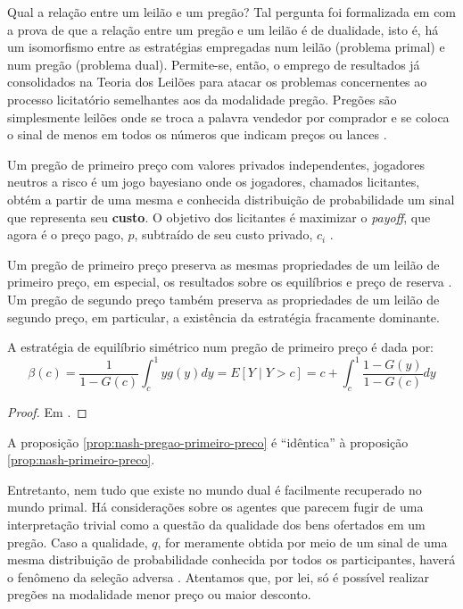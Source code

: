 Qual a relação entre um leilão e um pregão? Tal pergunta foi formalizada em \citet{deCastro2010} com a prova de que a relação entre um pregão e um leilão é de dualidade, isto é, há um isomorfismo entre as estratégias empregadas num leilão (problema primal) e num pregão (problema dual). Permite-se, então, o emprego de resultados já consolidados na Teoria dos Leilões para atacar os problemas concernentes ao processo licitatório semelhantes aos da modalidade pregão. Pregões são simplesmente leilões onde se troca a palavra vendedor por comprador e se coloca o sinal de menos em todos os números que indicam preços ou lances \citet{Shoham2008}.

Um pregão de primeiro preço com valores privados independentes, jogadores neutros a risco é um jogo bayesiano onde os jogadores, chamados licitantes, obtém a partir de uma mesma e conhecida distribuição de probabilidade um sinal que representa seu \textbf{custo}. O objetivo dos licitantes é maximizar o \emph{payoff}, que agora é o preço pago, $p$, subtraído de seu custo privado, $c_i$ \citet{Bugarin2022}.

Um pregão de primeiro preço preserva as mesmas propriedades de um leilão de primeiro preço, em especial, os resultados sobre os equilíbrios e preço de reserva \citet{Bugarin2022}. Um pregão de segundo preço também preserva as propriedades de um leilão de segundo preço, em particular, a existência da estratégia fracamente dominante.

\begin{proposicao}
	\label{prop:nash-pregao-primeiro-preco}
	A estratégia de equilíbrio simétrico num pregão de primeiro preço é dada por:
	\begin{equation}
		\beta(c) = \frac{1}{1-G(c)} \int_c^1 yg(y)dy = E[Y \mid Y > c] = c + \int_c^1 \frac{1-G(y)}{1-G(c)}dy
	\end{equation}
\end{proposicao}
\begin{proof}
	Em \citet{Bugarin2022}.
\end{proof}

A proposição \ref{prop:nash-pregao-primeiro-preco} é ``idêntica'' à proposição \ref{prop:nash-primeiro-preco}.

Entretanto, nem tudo que existe no mundo dual é facilmente recuperado no mundo primal. Há considerações sobre os agentes que parecem fugir de uma interpretação trivial como a questão da qualidade dos bens ofertados em um pregão. Caso a qualidade, $q$, for meramente obtida por meio de um sinal de uma mesma distribuição de probabilidade conhecida por todos os participantes, haverá o fenômeno da seleção adversa \citet{Che1993}. Atentamos que, por lei, só é possível realizar pregões na modalidade menor preço ou maior desconto. 


